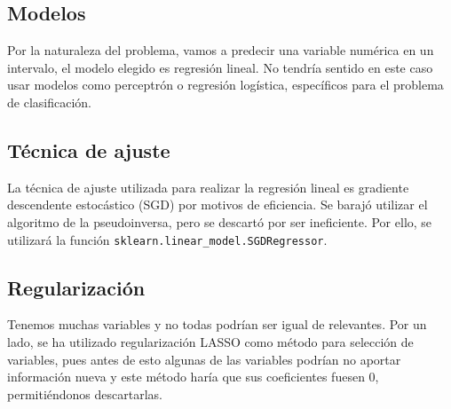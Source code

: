 \documentclass[a4paper, 20pt]{article}
\begin{document}
{%
\subsection{Modelos}
Por la naturaleza del problema, vamos a predecir una variable numérica en un intervalo, el modelo elegido es regresión lineal. No tendría sentido en este caso usar modelos como perceptrón o regresión logística, específicos para el problema de clasificación.

\subsection{Técnica de ajuste}

La técnica de ajuste utilizada para realizar la regresión lineal es gradiente descendente estocástico (SGD) por motivos de eficiencia. Se barajó utilizar el algoritmo de la pseudoinversa, pero se descartó por ser ineficiente. Por ello, se utilizará la función \texttt{sklearn.linear\_model.SGDRegressor}.


\subsection{Regularización}
Tenemos muchas variables y no todas podrían ser igual de relevantes. Por un lado, se ha utilizado regularización LASSO como método para selección de variables, pues antes de esto algunas de las variables podrían no aportar información nueva y este método haría que sus coeficientes fuesen 0, permitiéndonos descartarlas.

}
\end{document}
